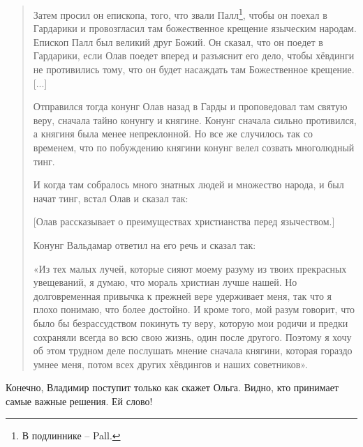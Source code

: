\begin{quotation}
Затем просил он епископа, того, что звали Палл\footnote{В подлиннике – Pall.}, чтобы он поехал в Гардарики и провозгласил там божественное крещение языческим народам. Епископ Палл был великий друг Божий. Он сказал, что он поедет в Гардарики, если Олав поедет вперед и разъяснит его дело, чтобы хёвдинги не противились тому, что он будет насаждать там Божественное крещение. [...]

Отправился тогда конунг Олав назад в Гарды и проповедовал там святую веру, сначала тайно конунгу и княгине. Конунг сначала сильно противился, а княгиня была менее непреклонной. Но все же случилось так со временем, что по побуждению княгини конунг велел созвать многолюдный тинг.

И когда там собралось много знатных людей и множество народа, и был начат тинг, встал Олав и сказал так: 

[Олав рассказывает о преимуществах христианства перед язычеством.]

Конунг Вальдамар ответил на его речь и сказал так:

«Из тех малых лучей, которые сияют моему разуму из твоих прекрасных увещеваний, я думаю, что мораль христиан лучше нашей. Но долговременная привычка к прежней вере удерживает меня, так что я плохо понимаю, что более достойно. И кроме того, мой разум говорит, что было бы безрассудством покинуть ту веру, которую мои родичи и предки сохраняли всегда во всю свою жизнь, один после другого. Поэтому я хочу об этом трудном деле послушать мнение сначала княгини, которая гораздо умнее меня, потом всех других хёвдингов и наших советников».
\end{quotation}

Конечно, Владимир поступит только как скажет Ольга. Видно, кто принимает самые важные решения. Ей слово! 

